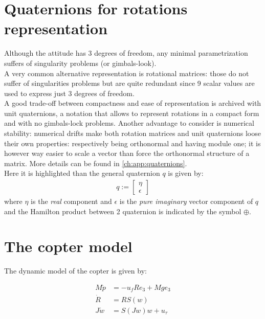 \section{Quaternions for rotations representation}
Although the attitude has 3 degrees of freedom, any minimal parametrization suffers of singularity problems (or gimbals-look).\\
A very common alternative representation is rotational matrices: those do not suffer of singularities problems but are quite  redundant since 9 scalar values are used to express just 3 degrees of freedom.\\
A good trade-off between compactness and ease of representation is archived with unit quaternions, a notation that allows to represent rotations in a compact form and with no gimbals-lock problems. Another advantage to consider is numerical stability: numerical drifts make both rotation matrices and unit quaternions loose their own properties: respectively being orthonormal and having module one; it is however way easier to scale a vector than force the orthonormal structure of a matrix. More details can be found in \autoref{ch:app:quaternions}.\\
Here it is highlighted than the general quaternion $q$ is given by:
\begin{equation} \label{eq:coptermodelmat}
\begin{split}
q := \begin{bmatrix}
\eta\\
\epsilon
\end{bmatrix}
\end{split}
\end{equation}
where $\eta$ is the \emph{real} component and $\epsilon$ is the \emph{pure imaginary} vector component of $q$ and the Hamilton product between 2 quaternion is indicated by the symbol $\oplus$.

\section{The copter model}
The dynamic model of the copter is given by:

\begin{equation} \label{eq:coptermodelmat}
\begin{split}
	M \ddot{p} &= -u_{f}Re_{3} + Mge_{3}\\
	\dot{R} &= RS(w)\\
	J\dot{w} &= S (Jw) w + u_{\tau}
\end{split}
\end{equation}

